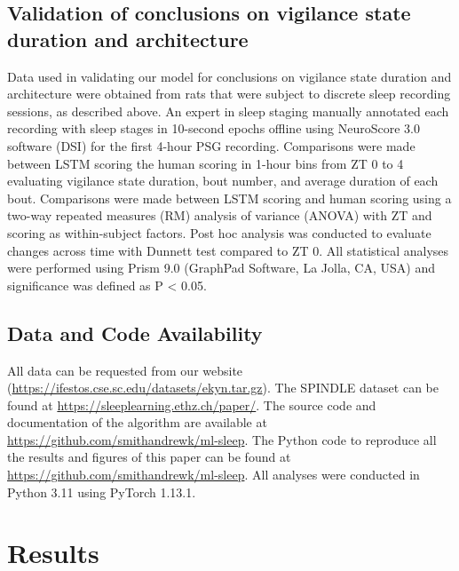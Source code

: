\documentclass[pdflatex,sn-mathphys-num]{sn-jnl}%
\theoremstyle{thmstyleone}%
\theoremstyle{thmstyletwo}%
\theoremstyle{thmstylethree}%
\begin{document}
\subsection*{Validation of conclusions on vigilance state duration and architecture}
Data used in validating our model for conclusions on vigilance state duration and architecture were obtained from rats that were subject to discrete sleep recording sessions, as described above. An expert in sleep staging manually annotated each recording with sleep stages in 10-second epochs offline using NeuroScore 3.0 software (DSI) for the first 4-hour PSG recording. Comparisons were made between LSTM scoring the human scoring in 1-hour bins from ZT 0 to 4 evaluating vigilance state duration, bout number, and average duration of each bout. Comparisons were made between LSTM scoring and human scoring using a two-way repeated measures (RM) analysis of variance (ANOVA) with ZT and scoring as within-subject factors. Post hoc analysis was conducted to evaluate changes across time with Dunnett test compared to ZT 0. All statistical analyses were performed using Prism 9.0 (GraphPad Software, La Jolla, CA, USA) and significance was defined as P < 0.05.

\subsection*{Data and Code Availability}
All data can be requested from our website (\href{https://ifestos.cse.sc.edu/datasets/ekyn.tar.gz}{https://ifestos.cse.sc.edu/datasets/ekyn.tar.gz}). The SPINDLE dataset can be found at \href{https://sleeplearning.ethz.ch/paper/}{https://sleeplearning.ethz.ch/paper/}. The source code and documentation of the algorithm are available at \href{https://github.com/smithandrewk/ml-sleep}{https://github.com/smithandrewk/ml-sleep}. The Python code to reproduce all the results and figures of this paper can be found at \href{https://github.com/smithandrewk/ml-sleep}{https://github.com/smithandrewk/ml-sleep}. All analyses were conducted in Python 3.11 using PyTorch 1.13.1.

\section{Results}\label{results}
\end{document}
